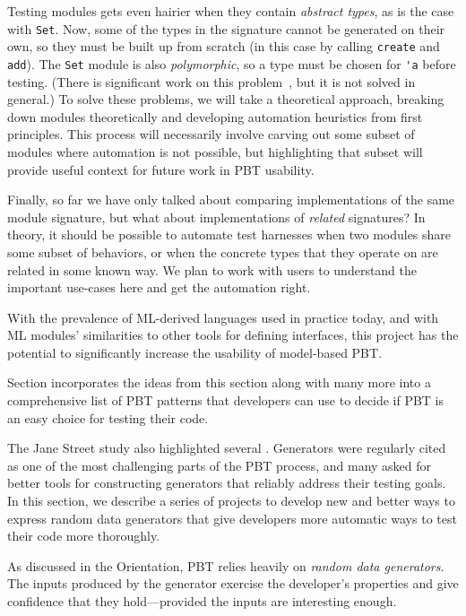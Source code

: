 Testing modules gets even hairier when they contain {\em abstract types}, as is
the case with \lstinline{Set}. Now, some of the types in the signature cannot be
generated on their own, so they must be built up from scratch (in this case by
calling \lstinline{create} and \lstinline{add}). The \lstinline{Set} module is
also {\em polymorphic}, so a type must be chosen for \lstinline{'a} before
testing. (There is significant work on this
problem~\cite{hou_favonia_logarithm_2022}, but it is not solved in general.)
To solve these problems, we will take a theoretical approach, breaking down
modules theoretically and developing automation heuristics from first
principles. This process will necessarily involve carving out some subset of
modules where automation is not possible, but highlighting that subset will
provide useful context for future work in PBT usability.

Finally, so far we have only talked about comparing implementations of the same
module signature, but what about implementations of {\em related} signatures? In
theory, it should be possible to automate test harnesses when two modules share
some subset of behaviors, or when the concrete types that they operate on are
related in some known way. We plan to work with users to understand the
important use-cases here and get the automation right.

With the prevalence of ML-derived languages used in practice today, and with ML
modules' similarities to other tools for defining interfaces, this project has
the potential to significantly increase the usability of model-based PBT.

Section  incorporates the ideas from this section along
with many more into a comprehensive list of PBT patterns that developers can use
to decide if PBT is an easy choice for testing their code.

%
The Jane Street study also highlighted several .
Generators were regularly cited
as one of the most challenging parts of the
PBT process, and many
asked for better tools for constructing generators that reliably address
their testing goals. In this section, we describe a series of projects
to develop new and better ways to express random data generators that give
developers more automatic ways to test their code more thoroughly.

%
As discussed in the Orientation, PBT relies heavily on {\em random data
generators}. The inputs produced by the generator exercise the developer's
properties and give confidence that they hold---provided the inputs are
interesting enough.

